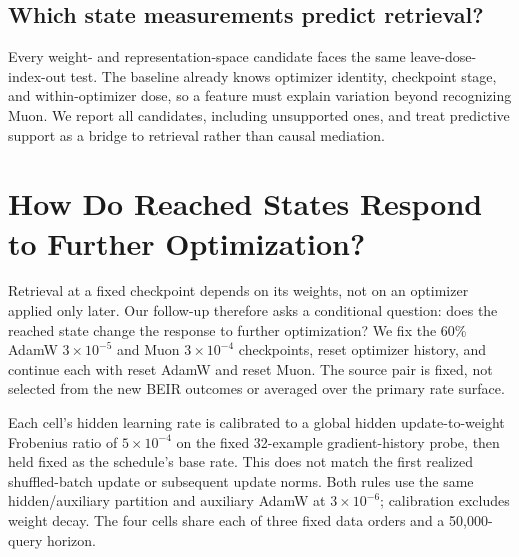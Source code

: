 \documentclass[11pt]{article}
\begin{document}
\DimensionUtilizationFinding

\DimensionUtilizationFigure

\subsection{Which state measurements predict retrieval?}

Every weight- and representation-space candidate faces the same leave-dose-index-out test. The
baseline already knows optimizer identity, checkpoint stage, and within-optimizer dose, so a feature
must explain variation beyond recognizing Muon. We report all candidates, including unsupported
ones, and treat predictive support as a bridge to retrieval rather than causal mediation.

\CorrectedGeometryBridgeFinding

\DimensionRetrievalBridgeFinding

\section{How Do Reached States Respond to Further Optimization?}

Retrieval at a fixed checkpoint depends on its weights, not on an optimizer applied only later.
Our follow-up therefore asks a conditional question: does the reached state change the response to
further optimization? We fix the 60\% AdamW $3\!\times\!10^{-5}$ and Muon $3\!\times\!10^{-4}$
checkpoints, reset optimizer history, and continue each with reset AdamW and reset Muon. The source
pair is fixed, not selected from the new BEIR outcomes or averaged over the primary rate surface.

Each cell's hidden learning rate is calibrated to a global hidden update-to-weight Frobenius ratio
of $5\!\times\!10^{-4}$ on the fixed 32-example gradient-history probe, then held fixed as the
schedule's base rate. This does not match the first realized shuffled-batch update or subsequent
update norms. Both rules use the same hidden/auxiliary partition and auxiliary AdamW at
$3\!\times\!10^{-6}$; calibration excludes weight decay. The four cells share each of three fixed
data orders and a 50,000-query horizon.
\end{document}
